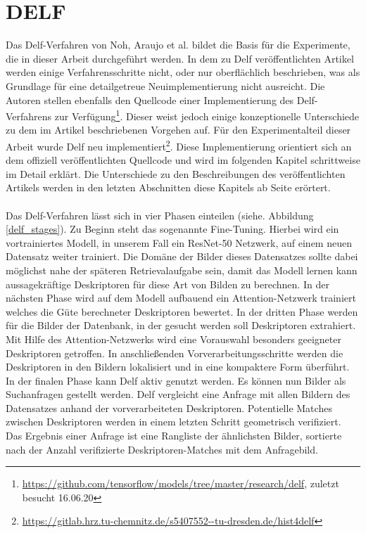 \chapter{DELF}\label{delf_chapter}
Das Delf-Verfahren \cite{delf} von Noh, \mbox{Araujo} et al. bildet die Basis für die Experimente, die in dieser Arbeit durchgeführt werden.
In dem zu Delf veröffentlichten Artikel werden einige Verfahrensschritte nicht, oder nur oberflächlich beschrieben, was als Grundlage für eine detailgetreue Neuimplementierung nicht ausreicht. Die Autoren stellen ebenfalls den Quellcode einer Implementierung des Delf-Verfahrens zur Verfügung\footnote{\url{https://github.com/tensorflow/models/tree/master/research/delf}, zuletzt besucht 16.06.20}. Dieser weist jedoch einige konzeptionelle Unterschiede zu dem im Artikel beschriebenen Vorgehen auf. Für den Experimentalteil dieser Arbeit wurde Delf neu implementiert\footnote{\url{https://gitlab.hrz.tu-chemnitz.de/s5407552--tu-dresden.de/hist4delf}}. Diese Implementierung orientiert sich an dem offiziell veröffentlichten Quellcode und wird im folgenden Kapitel schrittweise im Detail erklärt. Die Unterschiede zu den Beschreibungen des veröffentlichten Artikels werden in den letzten Abschnitten diese Kapitels ab Seite \pageref{pipeline_changes}  erörtert.  
\\\\
Das Delf-Verfahren lässt sich in vier Phasen einteilen (siehe. Abbildung \ref{delf_stages}). Zu Beginn steht das sogenannte Fine-Tuning. Hierbei wird ein vortrainiertes Modell, in unserem Fall ein ResNet-50 Netzwerk, auf einem neuen Datensatz weiter trainiert. Die Domäne der Bilder dieses Datensatzes sollte dabei möglichst nahe der späteren Retrievalaufgabe sein, damit das Modell lernen kann aussagekräftige Deskriptoren für diese Art von Bilden zu berechnen. In der nächsten Phase wird auf dem Modell aufbauend ein Attention-Netzwerk trainiert welches die Güte berechneter Deskriptoren bewertet. In der dritten Phase werden für die Bilder der Datenbank, in der gesucht werden soll Deskriptoren extrahiert. Mit Hilfe des Attention-Netzwerks wird eine Vorauswahl besonders geeigneter Deskriptoren getroffen. In anschließenden Vorverarbeitungsschritte werden die Deskriptoren in den Bildern lokalisiert und in eine kompaktere Form überführt. In der finalen Phase kann Delf aktiv genutzt werden. Es können nun Bilder als Suchanfragen gestellt werden. Delf vergleicht eine Anfrage mit allen Bildern des Datensatzes anhand der vorverarbeiteten Deskriptoren. Potentielle Matches zwischen Deskriptoren werden in einem letzten Schritt geometrisch verifiziert. Das Ergebnis einer Anfrage ist eine Rangliste der ähnlichsten Bilder, sortierte nach der Anzahl verifizierte Deskriptoren-Matches mit dem Anfragebild.
